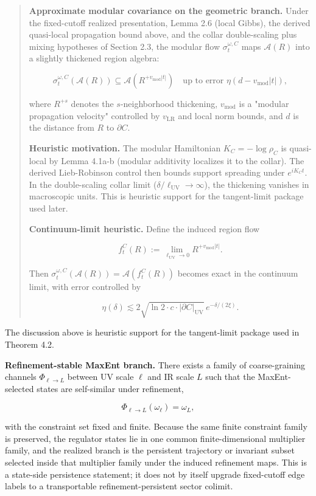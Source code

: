 \begin{quote}
\textbf{Approximate modular covariance on the geometric branch.} Under the fixed-cutoff realized presentation, Lemma 2.6 (local Gibbs), the derived quasi-local propagation bound above, and the collar double-scaling plus mixing hypotheses of Section 2.3, the modular flow \(\sigma_t^{\omega,C}\) maps \(\mathcal{A}(R)\) into a slightly thickened region algebra:

\[
\sigma_t^{\omega,C}(\mathcal{A}(R)) \subseteq \mathcal{A}(R^{+v_{\mathrm{mod}}|t|})
\quad \text{up to error } \eta(d - v_{\mathrm{mod}}|t|),
\]

where \(R^{+s}\) denotes the \(s\)-neighborhood thickening, \(v_{\mathrm{mod}}\) is a "modular propagation velocity" controlled by \(v_{\mathrm{LR}}\) and local norm bounds, and \(d\) is the distance from \(R\) to \(\partial C\).

\textbf{Heuristic motivation.} The modular Hamiltonian \(K_C = -\log \rho_C\) is quasi-local by Lemma 4.1a-b (modular additivity localizes it to the collar). The derived Lieb-Robinson control then bounds support spreading under \(e^{iK_C t}\). In the double-scaling collar limit (\(\delta/\ell_{\mathrm{UV}} \to \infty\)), the thickening vanishes in macroscopic units. This is heuristic support for the tangent-limit package used later.

\textbf{Continuum-limit heuristic.} Define the induced region flow

\[
f_t^C(R) := \lim_{\ell_{\mathrm{UV}} \to 0} R^{+v_{\mathrm{mod}}|t|}.
\]

Then \(\sigma_t^{\omega,C}(\mathcal{A}(R)) = \mathcal{A}(f_t^C(R))\) becomes exact in the continuum limit, with error controlled by

\[
\eta(\delta) \lesssim 2\sqrt{\ln 2 \cdot c \cdot |\partial C|_{\mathrm{UV}}} \, e^{-\delta/(2\xi)}.
\]
\end{quote}

The discussion above is heuristic support for the tangent-limit package used in Theorem 4.2.

\textbf{Refinement-stable MaxEnt branch.} There exists a family of coarse-graining channels \(\Phi_{\ell\to L}\) between UV scale \(\ell\) and IR scale \(L\) such that the MaxEnt-selected states are self-similar under refinement,

\[
\Phi_{\ell\to L}(\omega_{\ell}) = \omega_{L},
\]

with the constraint set fixed and finite. Because the same finite constraint family is preserved, the regulator states lie in one common finite-dimensional multiplier family, and the realized branch is the persistent trajectory or invariant subset selected inside that multiplier family under the induced refinement maps. This is a state-side persistence statement; it does not by itself upgrade fixed-cutoff edge labels to a transportable refinement-persistent sector colimit.

